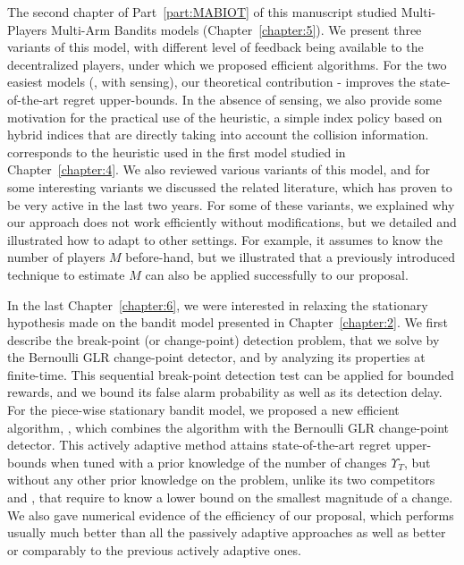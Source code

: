 The second chapter of Part~\ref{part:MABIOT} of this manuscript studied Multi-Players Multi-Arm Bandits models (Chapter~\ref{chapter:5}).
%
We present three variants of this model,
with different level of feedback being available to the decentralized players, under which we proposed efficient algorithms.
For the two easiest models (\ie, with sensing), our theoretical contribution \MCTopM-\klUCB{} improves the state-of-the-art regret upper-bounds.
In the absence of sensing, we also provide some motivation for the practical use of the \Selfish{} heuristic, a simple index policy based on hybrid indices that are directly taking  into account the collision information.
\Selfish{} corresponds to the heuristic used in the first model studied in Chapter~\ref{chapter:4}.
%
We also reviewed various variants of this model, and for some interesting variants we discussed the related literature, which has proven to be very active in the last two years.
For some of these variants, we explained why our approach does not work efficiently without modifications, but we detailed and illustrated how to adapt \MCTopM{} to other settings.
For example, it assumes to know the number of players $M$ before-hand, but we illustrated that a previously introduced technique to estimate $M$ can also be applied successfully to our proposal.



In the last Chapter~\ref{chapter:6}, we were interested in relaxing the stationary hypothesis made on the bandit model presented in Chapter~\ref{chapter:2}.
%
We first describe the break-point (or change-point) detection problem, that we solve by the Bernoulli GLR change-point detector, and by analyzing its properties at finite-time.
This sequential break-point detection test can be applied for bounded rewards, and we bound its false alarm probability as well as its detection delay.
For the piece-wise stationary bandit model,
we proposed a new efficient algorithm, \GLRklUCB, which combines the \klUCB{} algorithm with the Bernoulli GLR change-point detector.
This actively adaptive method attains state-of-the-art regret upper-bounds when tuned with a prior knowledge of the number of changes $\Upsilon_T$, but without any other prior knowledge on the problem, unlike its two competitors \CUSUMUCB{} and \MUCB, that require to know a lower bound on the smallest magnitude of a change.
We also gave numerical evidence of the efficiency of our proposal, which performs usually much better than all the passively adaptive approaches as well as better or comparably to the previous actively adaptive ones.


